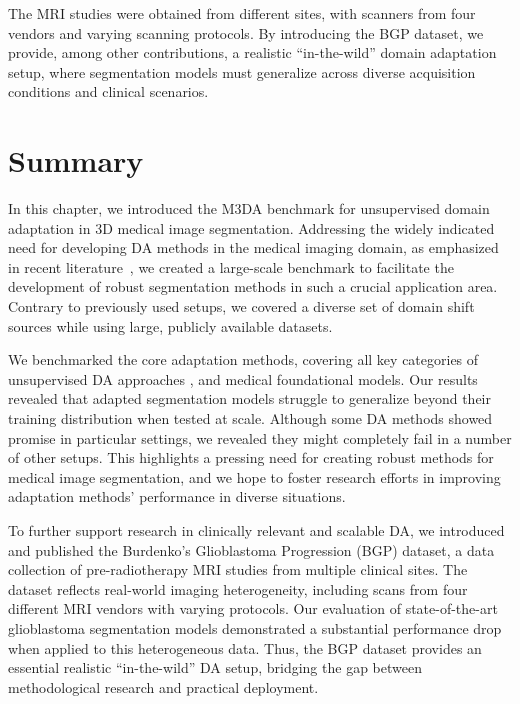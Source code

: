 The MRI studies were obtained from different sites, with scanners from four vendors and varying scanning protocols. %
By introducing the BGP dataset, we provide, among other contributions, a realistic ``in-the-wild'' domain adaptation setup, where segmentation models must generalize across diverse acquisition conditions and clinical scenarios.


\section{Summary}

In this chapter, we introduced the M3DA benchmark for unsupervised domain adaptation in 3D medical image segmentation. Addressing the widely indicated need for developing DA methods in the medical imaging domain, as emphasized in recent literature~\cite{gulrajani2020search,uda_survey_2020,zhuang2020comprehensive,peng2018visda,zhang2021empirical}, we created a large-scale benchmark to facilitate the development of robust segmentation methods in such a crucial application area. Contrary to previously used setups, we covered a diverse set of domain shift sources while using large, publicly available datasets.

We benchmarked the core adaptation methods, covering all key categories of unsupervised DA approaches \cite{medim_da_survey_2021,medim_da_survey_2023}, and medical foundational models. Our results revealed that adapted segmentation models struggle to generalize beyond their training distribution when tested at scale. Although some DA methods showed promise in particular settings, we revealed they might completely fail in a number of other setups. This highlights a pressing need for creating robust methods for medical image segmentation, and we hope to foster research efforts in improving adaptation methods’ performance in diverse situations.

To further support research in clinically relevant and scalable DA, we introduced and published the Burdenko's Glioblastoma Progression (BGP) dataset, a data collection of pre-radiotherapy MRI studies from multiple clinical sites. The dataset reflects real-world imaging heterogeneity, including scans from four different MRI vendors with varying protocols. Our evaluation of state-of-the-art glioblastoma segmentation models demonstrated a substantial performance drop when applied to this heterogeneous data. Thus, the BGP dataset provides an essential realistic ``in-the-wild'' DA setup, bridging the gap between methodological research and practical deployment.


